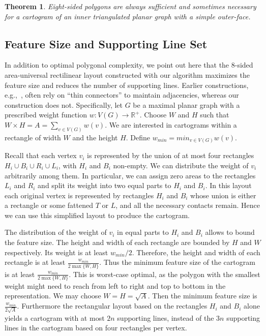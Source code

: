 \documentclass[11pt]{article}
\newtheorem{theorem}{Theorem}[section]
\begin{document}
\begin{theorem}
\label{th:eight-nece-suf} Eight-sided polygons are always sufficient and sometimes necessary for
 a cartogram of an inner triangulated planar graph with a simple outer-face.
\end{theorem}


\subsection{Feature Size and Supporting Line Set}

In addition to optimal polygonal complexity, we point out here that the 8-sided area-universal
 rectilinear layout constructed with our algorithm maximizes the feature size and reduces the
 number of supporting lines. Earlier constructions, e.g.,~\cite{deBerg07,BR-WADS11},
often rely on ``thin connectors'' to maintain adjacencies, whereas our
construction does not. Specifically, let $G$
be a maximal planar graph with a prescribed weight function $w:V(G)\rightarrow
\mathbb{R}^+$. Choose $W$ and $H$ such that $W\times H=A=\sum_{v\in V(G)}w(v)$. We are
interested in cartograms within a rectangle of width $W$ and the height $H$.
Define $w_{min}=min_{v\in V(G)}w(v)$.

Recall that each vertex $v_i$ is represented by the union of at most
four rectangles $H_i\cup B_i\cup R_i \cup L_i$, with $H_i$ and $B_i$
non-empty.  We can distribute the weight of $v_i$ arbitrarily among them.
In particular, we can
assign zero areas to the rectangles $L_i$ and $R_i$ and split its weight into
two equal parts to $H_i$ and $B_i$.
In this layout each original vertex is represented by rectangles
$H_i$ and $B_i$ whose union is either a rectangle or some fattened $T$ or $L$,
and all the necessary
contacts remain. Hence we can use this simplified layout to produce the
cartogram.



The distribution of the weight of $v_i$ in equal parts to $H_i$ and
$B_i$ allows to bound the feature size.  The height and width of each
rectangle are bounded by $H$ and $W$ respectively.  Its weight is at
least $w_{min}/2$. Therefore, the height and width of each rectangle is at
least $\frac{w_{min}}{2 \max\{W, H\}}$. Thus the minimum feature size of
the cartogram is at least $\frac{w_{min}}{2 \max\{W, H\}}$. This is
worst-case optimal, as the polygon with the smallest weight might need
to reach from left to right and top to bottom in the
representation. We may choose $W=H=\sqrt{A}$. Then the minimum feature
size is $\frac{w_{min}}{2\sqrt{A}}$. Furthermore the rectangular
layout based on the rectangles $H_i$ and $B_i$ alone yields a
cartogram with at most $2n$ supporting lines, instead of the $3n$
supporting lines in the cartogram based on four rectangles per vertex.
\end{document}
